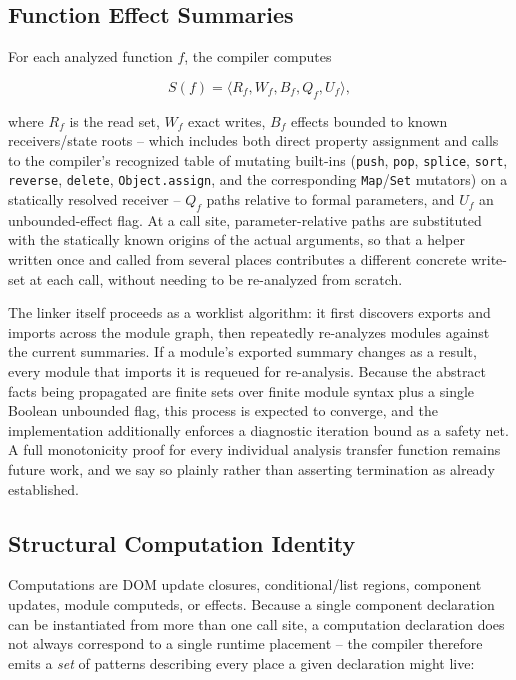 \documentclass[conference]{IEEEtran}
\begin{document}
\subsection{Function Effect Summaries}
\label{sec:tiers-ref}

For each analyzed function $f$, the compiler computes

\[
S(f)=\langle R_f,W_f,B_f,Q_f,U_f\rangle,
\]

where $R_f$ is the read set, $W_f$ exact writes, $B_f$ effects bounded to
known receivers/state roots -- which includes both direct property
assignment and calls to the compiler's recognized table of mutating
built-ins (\texttt{push}, \texttt{pop}, \texttt{splice}, \texttt{sort},
\texttt{reverse}, \texttt{delete}, \texttt{Object.assign}, and the
corresponding \texttt{Map}/\texttt{Set} mutators) on a statically resolved
receiver -- $Q_f$ paths relative to formal parameters, and $U_f$ an
unbounded-effect flag. At a call site, parameter-relative paths are
substituted with the statically known origins of the actual arguments, so
that a helper written once and called from several places contributes a
different concrete write-set at each call, without needing to be re-analyzed
from scratch.

The linker itself proceeds as a worklist algorithm: it first discovers
exports and imports across the module graph, then repeatedly re-analyzes
modules against the current summaries. If a module's exported summary
changes as a result, every module that imports it is requeued for
re-analysis. Because the abstract facts being propagated are finite sets over
finite module syntax plus a single Boolean unbounded flag, this process is
expected to converge, and the implementation additionally enforces a
diagnostic iteration bound as a safety net. A full monotonicity proof for
every individual analysis transfer function remains future work, and we say
so plainly rather than asserting termination as already established.

\subsection{Structural Computation Identity}

Computations are DOM update closures, conditional/list regions, component
updates, module computeds, or effects. Because a single component
declaration can be instantiated from more than one call site, a computation
declaration does not always correspond to a single runtime placement -- the
compiler therefore emits a \emph{set} of patterns describing every place a
given declaration might live:
\end{document}
